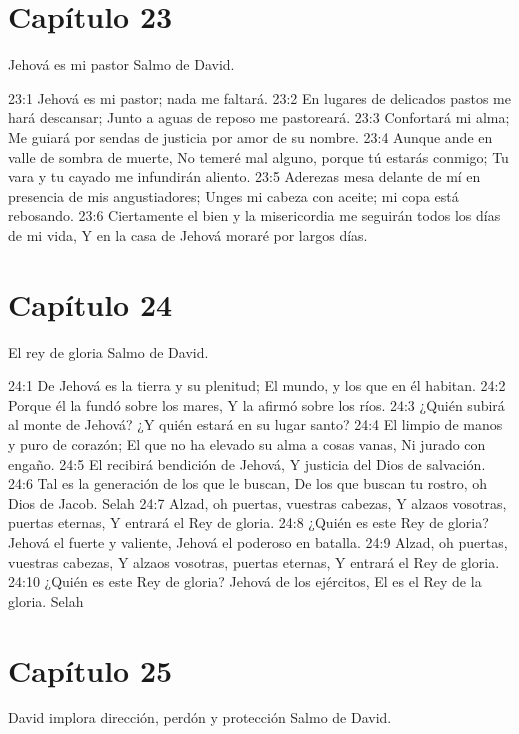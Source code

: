 \section*{Capítulo 23}
Jehová es mi pastor 
Salmo de David. 

23:1 Jehová es mi pastor; nada me faltará. 
23:2 En lugares de delicados pastos me hará descansar; 
Junto a aguas de reposo me pastoreará. 
23:3 Confortará mi alma; 
Me guiará por sendas de justicia por amor de su nombre. 
23:4 Aunque ande en valle de sombra de muerte, 
No temeré mal alguno, porque tú estarás conmigo; 
Tu vara y tu cayado me infundirán aliento. 
23:5 Aderezas mesa delante de mí en presencia de mis angustiadores; 
Unges mi cabeza con aceite; mi copa está rebosando. 
23:6 Ciertamente el bien y la misericordia me seguirán todos los días de mi vida, 
Y en la casa de Jehová moraré por largos días. 
\section*{Capítulo 24}
El rey de gloria 
Salmo de David. 

24:1 De Jehová es la tierra y su plenitud; 
El mundo, y los que en él habitan. 
24:2 Porque él la fundó sobre los mares, 
Y la afirmó sobre los ríos. 
24:3 ¿Quién subirá al monte de Jehová? 
¿Y quién estará en su lugar santo? 
24:4 El limpio de manos y puro de corazón; 
El que no ha elevado su alma a cosas vanas, 
Ni jurado con engaño. 
24:5 El recibirá bendición de Jehová, 
Y justicia del Dios de salvación. 
24:6 Tal es la generación de los que le buscan, 
De los que buscan tu rostro, oh Dios de Jacob. Selah 
24:7 Alzad, oh puertas, vuestras cabezas, 
Y alzaos vosotras, puertas eternas, 
Y entrará el Rey de gloria. 
24:8 ¿Quién es este Rey de gloria? 
Jehová el fuerte y valiente, 
Jehová el poderoso en batalla. 
24:9 Alzad, oh puertas, vuestras cabezas, 
Y alzaos vosotras, puertas eternas, 
Y entrará el Rey de gloria. 
24:10 ¿Quién es este Rey de gloria? 
Jehová de los ejércitos, 
El es el Rey de la gloria. Selah 
\section*{Capítulo 25}
David implora dirección, perdón y protección 
Salmo de David. 

